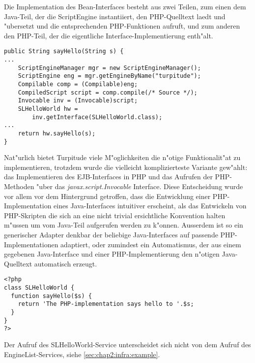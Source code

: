 Die Implementation des Bean-Interfaces besteht aus zwei Teilen, zum einen dem Java-Teil, der die
ScriptEngine instantiiert, den PHP-Quelltext laedt und "ubersetzt und die entsprechenden PHP-Funktionen
aufruft, und zum anderen den PHP-Teil, der die eigentliche Interface-Implementierung enth"alt.
\begin{lstlisting}[caption=Java-Teil]
public String sayHello(String s) {
...
    ScriptEngineManager mgr = new ScriptEngineManager();
    ScriptEngine eng = mgr.getEngineByName("turpitude");
    Compilable comp = (Compilable)eng;
    CompiledScript script = comp.compile(/* Source */);
    Invocable inv = (Invocable)script;
    SLHelloWorld hw = 
        inv.getInterface(SLHelloWorld.class);
...
    return hw.sayHello(s);
}
\end{lstlisting}
Nat"urlich bietet Turpitude viele M"oglichkeiten die n"otige Funktionalit"at zu implementieren,
trotzdem wurde die vielleicht komplizierteste Variante gew"ahlt: das Implementieren des EJB-Interfaces in
PHP und das Aufrufen der PHP-Methoden "uber das \emph{javax.script.Invocable} Interface. Diese Entscheidung 
wurde vor allem vor dem Hintergrund getroffen, dass die Entwicklung einer PHP-Implementation eines Java-Interfaces
intuitiver erscheint, als das Entwickeln von PHP-Skripten die sich an eine nicht trivial ersichtliche
Konvention halten m"ussen um vom Java-Teil aufgerufen werden zu k"onnen. Ausserdem ist so ein 
generischer Adapter denkbar der beliebige Java-Interfaces auf passende PHP-Implementationen adaptiert,
oder zumindest ein Automatismus, der aus einem gegebenen Java-Interface und einer PHP-Implementierung den 
n"otigen Java-Quelltext automatisch erzeugt.
\begin{lstlisting}[caption=PHP-Implementierung]
<?php
class SLHelloWorld {
  function sayHello($s) {
    return 'The PHP-implementation says hello to '.$s;
  }
}
?>
\end{lstlisting}
Der Aufruf des SLHelloWorld-Service unterscheidet sich nicht von dem Aufruf des EngineList-Services, siehe \ref{sec:chap2:infra:example}.

